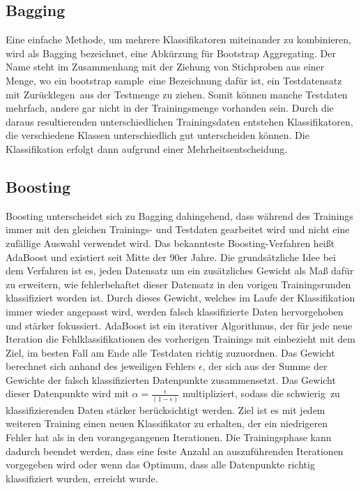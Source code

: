 \subsection*{Bagging}
Eine einfache Methode, um mehrere Klassifikatoren miteinander zu kombinieren, wird als Bagging bezeichnet, eine Abkürzung für Bootstrap Aggregating. Der Name steht im Zusammenhang mit der Ziehung von Stichproben aus einer Menge, wo ein \glqq bootstrap sample\grqq\ eine Bezeichnung dafür ist, ein Testdatensatz \glqq mit Zurücklegen\grqq\ aus der Testmenge zu ziehen. Somit können manche Testdaten mehrfach, andere gar nicht in der Trainingsmenge vorhanden sein. Durch die daraus resultierenden unterschiedlichen Trainingsdaten entstehen Klassifikatoren, die verschiedene Klassen unterschiedlich gut unterscheiden können. Die Klassifikation erfolgt dann aufgrund einer Mehrheitsentscheidung.

\subsection*{Boosting}
Boosting unterscheidet sich zu Bagging dahingehend, dass während des Trainings immer mit den gleichen Trainings- und Testdaten gearbeitet wird und nicht eine zufällige Auswahl verwendet wird.
Das bekannteste Boosting-Verfahren heißt AdaBoost und existiert seit Mitte der 90er Jahre. Die grundsätzliche Idee bei dem Verfahren ist es, jeden Datensatz um ein zusätzliches Gewicht als Maß dafür zu erweitern, wie fehlerbehaftet dieser Datensatz in den vorigen Trainingsrunden klassifiziert worden ist. Durch dieses Gewicht, welches im Laufe der Klassifikation immer wieder angepasst wird, werden falsch klassifizierte Daten hervorgehoben und stärker fokussiert. AdaBoost ist ein iterativer Algorithmus, der für jede neue Iteration die Fehlklassifikationen des vorherigen Trainings mit einbezieht mit dem Ziel, im besten Fall am Ende alle Testdaten richtig zuzuordnen. Das Gewicht berechnet sich anhand des jeweiligen Fehlers $\epsilon$, der sich aus der Summe der Gewichte der falsch klassifizierten Datenpunkte zusammensetzt. Das Gewicht dieser Datenpunkte wird mit
$ \alpha = \frac{\epsilon}{(1-\epsilon)} $ 
multipliziert, sodass die \glqq schwierig\grqq\ zu klassifizierenden Daten stärker berücksichtigt werden. Ziel ist es mit jedem weiteren Training einen neuen Klassifikator zu erhalten, der ein niedrigeren Fehler hat als in den vorangegangenen Iterationen. Die Trainingsphase kann dadurch beendet werden, dass eine feste Anzahl an auszuführenden Iterationen vorgegeben wird oder wenn das Optimum, dass alle Datenpunkte richtig klassifiziert wurden, erreicht wurde.

